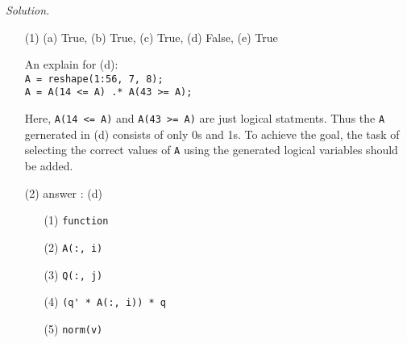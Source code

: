 \documentclass[11pt,a4paper]{article}
\begin{document}
\newpage

\noindent \textit{Solution.}
\begin{enumerate}
    \item[(1)] (a) True, (b) True, (c) True, (d) False, (e) True
    
    \vspace{2mm}
    
    An explain for (d):\\
    \verb"A = reshape(1:56, 7, 8);"\\
    \verb"A = A(14 <= A) .* A(43 >= A);"
    
    \vspace{2mm}
    
    Here, \verb"A(14 <= A)" and \verb"A(43 >= A)" are just logical statments. 
    Thus the \verb"A" gernerated in (d) consists of only 0s and 1s. 
    To achieve the goal, the task of selecting the correct values of \verb"A"
    using the generated logical variables should be added.
    
    \item[(2)] answer : (d)
    \begin{enumerate}
        \item[(1)] \verb"function"
        \item[(2)] \verb"A(:, i)"
        \item[(3)] \verb"Q(:, j)"
        \item[(4)] \verb"(q' * A(:, i)) * q"
        \item[(5)] \verb"norm(v)"
    \end{enumerate}
\end{enumerate}
\end{document}
